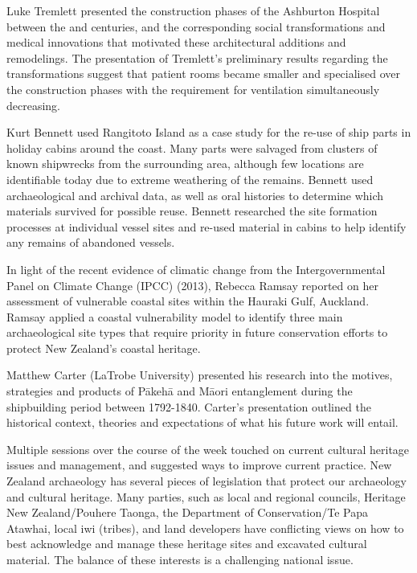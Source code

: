 Luke Tremlett presented the construction phases of the Ashburton Hospital between the  and  centuries, and the corresponding social transformations and medical innovations that motivated these architectural additions and remodelings. The presentation of Tremlett’s preliminary results regarding the transformations suggest that patient rooms became smaller and specialised over the construction phases with the requirement for ventilation simultaneously decreasing. 

Kurt Bennett used Rangitoto Island as a case study for the re-use of ship parts in holiday cabins around the coast. Many parts were salvaged from clusters of known shipwrecks from the surrounding area, although few locations are identifiable today due to extreme weathering of the remains. Bennett used archaeological and archival data, as well as oral histories to determine which materials survived for possible reuse. Bennett researched the site formation processes at individual vessel sites and re-used material in cabins to help identify any remains of abandoned vessels.

In light of the recent evidence of climatic change from the Intergovernmental Panel on Climate Change (IPCC) (2013), Rebecca Ramsay reported on her assessment of vulnerable coastal sites within the Hauraki Gulf, Auckland. Ramsay applied a coastal vulnerability model to identify three main archaeological site types that require priority in future conservation efforts to protect New Zealand’s coastal heritage.

Matthew Carter (LaTrobe University) presented his research into the motives, strategies and products of Pākehā and Māori entanglement during the shipbuilding period between 1792-1840. Carter’s presentation outlined the historical context, theories and expectations of what his future work will entail. 


Multiple sessions over the course of the week touched on current cultural heritage issues and management, and suggested ways to improve current practice. New Zealand archaeology has several pieces of legislation that protect our archaeology and cultural heritage. Many parties, such as local and regional councils, Heritage New Zealand/Pouhere Taonga, the Department of Conservation/Te Papa Atawhai, local iwi (tribes), and land developers have conflicting views on how to best acknowledge and manage these heritage sites and excavated cultural material. The balance of these interests is a challenging national issue.

